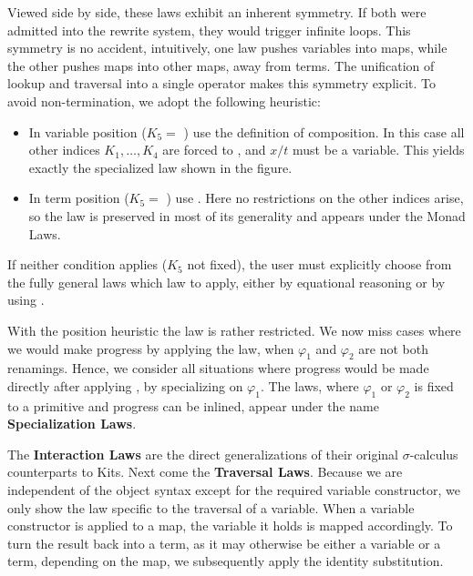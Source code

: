 \documentclass[screen,nonacm]{acmart}
\begin{document}
\noindent\begin{minipage}{0.45\linewidth}
      \raggedright{}
      \ECompGeneral{}
\end{minipage}
\begin{minipage}{0.55\linewidth}
      \raggedright{}
      \ECompoGeneral{}
\end{minipage}

\noindent Viewed side by side, these laws exhibit an inherent symmetry. If both were admitted into the
rewrite system, they would trigger infinite loops. This symmetry is no accident, intuitively, one law pushes variables into maps, while the other pushes maps into other maps, away from terms. The unification of lookup and traversal into a single operator makes this symmetry explicit.
To avoid non-termination, we adopt the following heuristic:
\begin{itemize}
      \item In variable position ($K_5 = $ ) use the definition of
            composition. In this case all other indices $K_1,\dots,K_4$ are forced to
            , and $x/t$ must be a variable. This yields exactly the
            specialized  law shown in the figure.
      \item In term position ($K_5 = $ ) use .
            Here no restrictions on the other indices arise, so the law is preserved in
            most of its generality and appears under the Monad Laws.
\end{itemize}

\noindent If neither condition applies ($K_5$ not fixed), the user must explicitly choose from the fully
general laws which law to apply, either by equational reasoning or by using
.

With the position heuristic the  law is rather restricted.
We now miss cases where we would make progress by applying the
 law, when $\varphi_1$ and $\varphi_2$ are not both
renamings. Hence, we consider all situations where progress would be made
directly after applying , by specializing on $\varphi_1$.
The laws, where $\varphi_1$ or $\varphi_2$ is fixed to a primitive and progress
can be inlined, appear under the name \textbf{Specialization Laws}.

The \textbf{Interaction Laws} are the direct generalizations of their original
$σ$-calculus counterparts to Kits. Next come the \textbf{Traversal Laws}.
Because we are independent of the object syntax except for the required
variable constructor, we only show the law specific to the traversal of a
variable. When a variable constructor is applied to a map, the variable it
holds is mapped accordingly. To turn the result back into a term, as it may
otherwise be either a variable or a term, depending on the map, we subsequently
apply the identity substitution.
\end{document}
